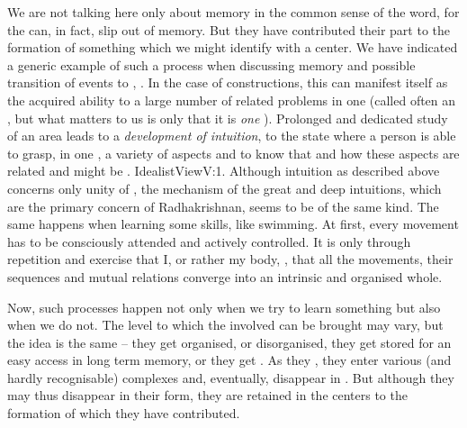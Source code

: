 We are not talking here only about memory in the common sense of the word, for
the   can, in fact, slip out of memory.  But
they have contributed their part to the formation of something which we might
identify with a  center.  We have indicated a generic example of
such a process when discussing memory and possible transition of 
events to , .  In the case of 
constructions, this can manifest itself as the acquired ability to 
a large number of related problems in {one}  (called often an , but what matters to us is only that it is {\em one} ).
Prolonged and dedicated study of an area leads to a {\em development of
  intuition}, to the state where a person is able to grasp, in one , a
variety of aspects and to know that and how these aspects are related and might
be . \citet{The successful practice of intuition requires
  previous study and assimilation of a multitude of facts and laws. We may take
  it that great intuitions arise out of matrix of
  rationality.}{IdealistView}{V:1. Although intuition as described
  above concerns only unity of , the mechanism of the
  great and deep intuitions, which are the primary concern of Radhakrishnan,
  seems to be of the same kind.}  The same happens when learning some skills,
like swimming.  At first, every movement has to be consciously attended and
actively controlled.  It is only through repetition and exercise that I, or
rather my body, , that all the movements, their sequences and
mutual relations converge into an intrinsic and organised whole.


\pa Now, such processes happen not only when we try to learn something but also
when we do not.  The level to which the involved  can be brought
may vary, but the idea is the same -- they get organised, or disorganised, they
get stored for an easy access in long term memory, or they get .
As they , they enter various (and hardly recognisable)
complexes and, eventually, disappear in .  
But although they may thus disappear in their  form, they are
retained in the  centers to the formation of which they have
contributed.


